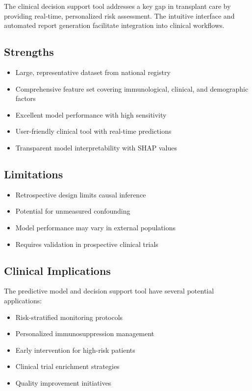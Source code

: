\documentclass[12pt,a4paper]{article}
\begin{document}
The clinical decision support tool addresses a key gap in transplant care by providing real-time, personalized risk assessment. The intuitive interface and automated report generation facilitate integration into clinical workflows.

\subsection{Strengths}

\begin{itemize}
\item Large, representative dataset from national registry
\item Comprehensive feature set covering immunological, clinical, and demographic factors
\item Excellent model performance with high sensitivity
\item User-friendly clinical tool with real-time predictions
\item Transparent model interpretability with SHAP values
\end{itemize}

\subsection{Limitations}

\begin{itemize}
\item Retrospective design limits causal inference
\item Potential for unmeasured confounding
\item Model performance may vary in external populations
\item Requires validation in prospective clinical trials
\end{itemize}

\subsection{Clinical Implications}

The predictive model and decision support tool have several potential applications:
\begin{itemize}
\item Risk-stratified monitoring protocols
\item Personalized immunosuppression management
\item Early intervention for high-risk patients
\item Clinical trial enrichment strategies
\item Quality improvement initiatives
\end{itemize}
\end{document}
